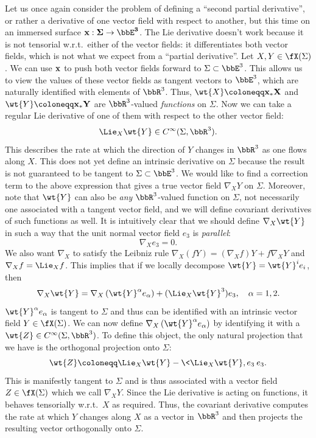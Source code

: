 \begin{rem}
    Let us once again consider the problem of defining a ``second partial derivative'', or rather a derivative of one vector field with respect to another, but this time on an immersed surface $\bf{x}:\Sigma\to \bbE^3$. The Lie derivative doesn't work because it is not tensorial w.r.t.\ either of the vector fields: it differentiates both vector fields, which is not what we expect from a ``partial derivative''. Let $X,Y\in\fX(\Sigma)$. We can use $\bf{x}$ to push both vector fields forward to $\Sigma\subset \bbE^3$. This allows us to view the values of these vector fields as tangent vectors to $\bbE^3$, which are naturally identified with elements of $\bbR^3$. Thus, $\wt{X}\coloneqq \bf{x}_\ast X$ and $\wt{Y}\coloneqq \bf{x}_\ast Y$ are $\bbR^3$-valued \emph{functions} on $\Sigma$. Now we can take a regular Lie derivative of one of them with respect to the other vector field:
    \[\Lie_X \wt{Y}\in C^\infty(\Sigma,\bbR^3).\]
    This describes the rate at which the direction of $Y$ changes in $\bbR^3$ as one flows along $X$. This does not yet define an intrinsic derivative on $\Sigma$ because the result is not guaranteed to be tangent to $\Sigma\subset \bbE^3$. We would like to find a correction term to the above expression that gives a true vector field $\nabla_X Y$ on $\Sigma$. Moreover, note that $\wt{Y}$ can also be \emph{any} $\bbR^3$-valued function on $\Sigma$, not necessarily one associated with a tangent vector field, and we will define covariant derivatives of such functions as well. It is intuitively clear that we should define $\nabla_X \wt{Y}$ in such a way that the unit normal vector field $e_3$ is \emph{parallel}:
    \[\nabla_X e_3=0.\]
    We also want $\nabla_X$ to satisfy the Leibniz rule $\nabla_X (fY)=(\nabla_X f)Y+f\nabla_X Y$ and $\nabla_X f=\Lie_X f$. This implies that if we locally decompose $\wt{Y}=\wt{Y}^i e_i$, then 
    \[\nabla_X \wt{Y}=\nabla_X\left(\wt{Y}^\alpha e_\alpha\right)+(\Lie_X\wt{Y}^3)e_3,\quad \alpha=1,2.\]
    $\wt{Y}^\alpha e_\alpha$ is tangent to $\Sigma$ and thus can be identified with an intrinsic vector field $Y\in\fX(\Sigma)$. We can now define $\nabla_X\left(\wt{Y}^\alpha e_\alpha\right)$ by identifying it with a $\wt{Z}\in C^\infty(\Sigma,\bbR^3)$. To define this object, the only natural projection that we have is the orthogonal projection onto $\Sigma$:
    \[\wt{Z}\coloneqq \Lie_X \wt{Y}-\<\Lie_X \wt{Y},e_3\>e_3.\]
    This is manifestly tangent to $\Sigma$ and is thus associated with a vector field $Z\in\fX(\Sigma)$ which we call $\nabla_X Y$. Since the Lie derivative is acting on functions, it behaves tensorially w.r.t.\ $X$ as required. Thus, the covariant derivative computes the rate at which $Y$ changes along $X$ as a vector in $\bbR^3$ and then projects the resulting vector orthogonally onto $\Sigma$.


\end{rem}
